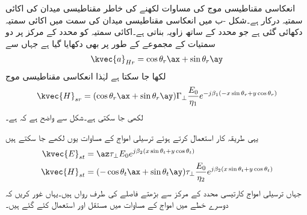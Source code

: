 انعکاسی مقناطیسی موج کی مساوات لکھنے کی خاطر مقناطیسی میدان کی اکائی سمتیہ درکار ہے۔شکل -ب میں انعکاسی مقناطیسی میدان کی سمت میں اکائی سمتیہ  دکھائی گئی ہے جو  محدد کے ساتھ  زاویہ بناتی ہے۔اکائی سمتیہ کو محدد کے مرکز پر دو سمتیات کے مجموعے کے طور پر بھی دکھایا گیا ہے جہاں سے
\begin{align}
\kvec{a}_{Hr}=\cos \theta_r \ax+\sin \theta_r \ay
\end{align}
لکھا جا سکتا ہے لہٰذا انعکاسی مقناطیسی موج
\begin{align} \label{مساوات_ترچھی_انعکاسی_مقناطیسی_میدان_دوری_سمتی}
\kvec{H}_{sr}=(\cos \theta_r \ax+\sin \theta_r \ay)\Gamma_{\perp} \frac{ E_0}{\eta_1} e^{-j \beta_1 (-x \sin \theta_r+y\cos \theta_r)}
\end{align}
لکھی جا سکتی ہے۔شکل سے واضح ہے کہ  ہے۔

یہی طریقہ کار استعمال  کرتے ہوئے ترسیلی امواج کے مساوات یوں لکھے جا سکتے ہیں
\begin{align}
\kvec{E}_{st} &=\az \tau_{\perp} E_0 e^{j \beta_2 (x \sin \theta_t+y\cos \theta_t)}  \label{مساوات_ترچھی_انحرافی_برقی_میدان_دوری_سمتی}\\
\kvec{H}_{st} &=(-\cos \theta_t \ax+\sin \theta_t \ay ) \tau_{\perp} \frac{E_0}{\eta_2} e^{j \beta_2 (x \sin \theta_t+y\cos \theta_t)}  \label{مساوات_ترچھی_انحرافی_مقناطیسی_میدان_دوری_سمتی}
\end{align}
جہاں ترسیلی امواج کارتیسی محدد کے مرکز سے بڑھتے فاصلے کی طرف رواں ہیں۔یہاں غور کریں کہ دوسرے خطے میں امواج کے مساوات میں مستقل  اور  استعمال کئے گئے ہیں۔

